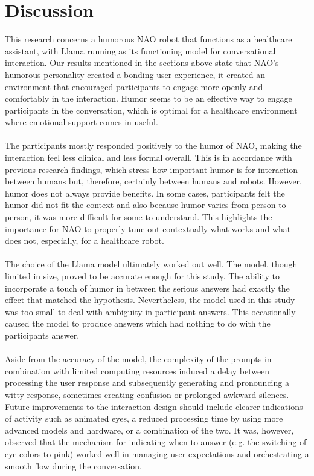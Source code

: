 \documentclass[runningheads]{llncs}
\begin{document}
\section{Discussion}
This research concerns a humorous NAO robot that functions as a healthcare assistant, with Llama running as its functioning model for conversational interaction. Our results mentioned in the sections above state that NAO's humorous personality created a bonding user experience, it created an environment that encouraged participants to engage more openly and comfortably in the interaction. Humor seems to be an effective way to engage participants in the conversation, which is optimal for a healthcare environment where emotional support comes in useful.
\\\\
The participants mostly responded positively to the humor of NAO, making the interaction feel less clinical and less formal overall. This is in accordance with previous research findings, which stress how important humor is for interaction between humans \cite{Meyer} but, therefore, certainly between humans and robots. However, humor does not always provide benefits. In some cases, participants felt the humor did not fit the context and also because humor varies from person to person, it was more difficult for some to understand. This highlights the importance for NAO to properly tune out contextually what works and what does not, especially, for a healthcare robot.
\\\\
The choice of the Llama model ultimately worked out well. The model, though limited in size, proved to be accurate enough for this study. The ability to incorporate a touch of humor in between the serious answers had exactly the effect that matched the hypothesis. Nevertheless, the model used in this study was too small to deal with ambiguity in participant answers. This occasionally caused the model to produce answers which had nothing to do with the participants answer.
\\\\
Aside from the accuracy of the model, the complexity of the prompts in combination with limited computing resources induced a delay between processing the user response and subsequently generating and pronouncing a witty response, sometimes creating confusion or prolonged awkward silences. Future improvements to the interaction design should include clearer indications of activity such as animated eyes, a reduced processing time by using more advanced models and hardware, or a combination of the two. It was, however, observed that the mechanism for indicating when to answer (e.g. the switching of eye colors to pink) worked well in managing user expectations and orchestrating a smooth flow during the conversation.
\end{document}
